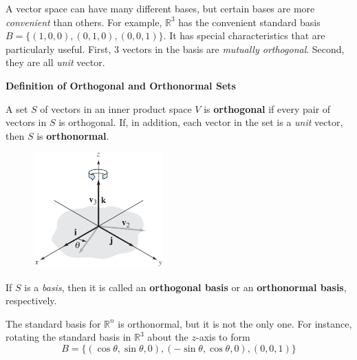 \documentclass{article}
\newcounter{example}[section]
\newcommand\B{\textbf}
\newcommand\tcl{\begin{tcolorbox}[colback = {blue9}]}
\newcommand\etcl{\end{tcolorbox}}
\newcommand\R{\mathbb{R}}
\newcommand\T{\textit}
\begin{document}
    A vector space can have many different bases, but certain bases are more \textit{convenient} than others.
    For example, $\R^3$ has the convenient standard basis $B = \{ (1,0,0), (0,1,0), (0,0,1) \}$. It has 
    special characteristics that are particularly useful. First, 3 vectors in the basis are 
    \textit{mutually orthogonal}. Second, they are all \T{unit} vector.

    \tcl
    \B{Definition of Orthogonal and Orthonormal Sets}

    A set $S$ of vectors in an inner product space $V$ is \B{orthogonal} if every pair of
    vectors in $S$ is orthogonal. If, in addition, each vector in the set is a \T{unit} vector,
    then $S$ is \B{orthonormal}.
    \etcl 

    \begin{minipage}{0.35\textwidth}
    \begin{figure}[H]
    \includegraphics[width = 5cm]{images/r3rotatebasis.png}
    \end{figure}
    \end{minipage} 
    \begin{minipage}{0.6\textwidth}
        If $S$ is a \textit{basis}, then it is called an \B{orthogonal basis} or 
        an \B{orthonormal basis}, respectively.

        The standard basis for $\R^n$ is orthonormal, but it is not the only one. For instance,
        rotating the standard basis in $\R^3$ about the $z$-axis to form
        \[B = \{ (\cos{\theta}, \sin{\theta},0), (-\sin{\theta}, \cos{\theta}, 0), (0, 0, 1) \} \]
    \end{minipage}
\end{document}
